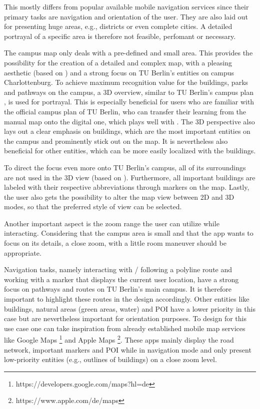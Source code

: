 This mostly differs from popular available mobile navigation services since their primary tasks are navigation and orientation of the user. They are also laid out for presenting huge areas, e.g., districts or even complete cities. A detailed portrayal of a specific area is therefore not feasible, perfomant or necessary.

The campus map only deals with a pre-defined and small area. This provides the possibility for the creation of a detailed and complex map, with a pleasing aesthetic (based on \cite{aesthetic_usability_effect}) and a strong focus on TU Berlin's entities on campus Charlottenburg. To achieve maximum recognition value for the buildings, parks and pathways on the campus, a 3D overview, similar to TU Berlin's campus plan \cite{campus_plan}, is used for portrayal. This is especially beneficial for users who are familiar with the official campus plan of TU Berlin, who can transfer their learning from the manual map onto the digital one, which plays well with \cite{jakobs_law}. The 3D perspective also lays out a clear emphasis on buildings, which are the most important entities on the campus and prominently stick out on the map. It is nevertheless also beneficial for other entities, which can be more easily localized with the buildings.

To direct the focus even more onto TU Berlin's campus, all of its surroundings are not used in the 3D view (based on \cite{law_of_common_region}). Furthermore, all important buildings are labeled with their respective abbreviations through markers on the map. Lastly, the user also gets the possibility to alter the map view between 2D and 3D modes, so that the preferred style of view can be selected.

Another important aspect is the zoom range the user can utilize while interacting. Considering that the campus area is small and that the app wants to focus on its details, a close zoom, with a little room maneuver should be appropriate.

Navigation tasks, namely interacting with / following a polyline route and working with a marker that displays the current user location, have a strong focus on pathways and routes on TU Berlin's main campus. It is therefore important to highlight these routes in the design accordingly. Other entities like buildings, natural areas (green areas, water) and POI have a lower priority in this case but are nevertheless important for orientation purposes. To design for this use case one can take inspiration from already established mobile map services like Google Maps \footnote{https://developers.google.com/maps?hl=de} and Apple Maps \footnote{https://www.apple.com/de/maps}. These apps mainly display the road network, important markers and POI while in navigation mode and only present low-priority entities (e.g., outlines of buildings) on a close zoom level.

